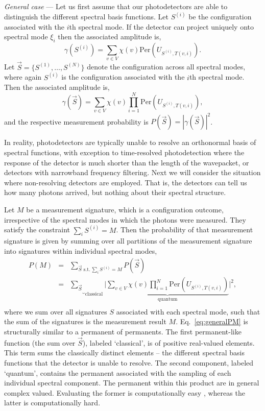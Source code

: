 \documentclass[aps,prl,twocolumn,amsmath,amssymb,nofootinbib,superscriptaddress]{revtex4}
\begin{document}
\emph{General case} --- Let us first assume that our photodetectors are able to distinguish the different spectral basis functions. Let $S^{(i)}$ be the configuration associated with the $i$th spectral mode. If the detector can project uniquely onto spectral mode $\xi_i$ then the associated amplitude is,
\begin{equation}
\gamma(S^{(i)}) = \sum_{v\in V} \chi(v) \mathrm{Per}\left(U_{S^{(i)},T(v,i)}\right).
\end{equation}
Let \mbox{$\vec{S}=\{S^{(1)},\dots,S^{(N)}\}$} denote the configuration across all spectral modes, where again $S^{(i)}$ is the configuration associated with the $i$th spectral mode. Then the associated amplitude is,
\begin{equation}
\gamma(\vec{S}) = \sum_{v\in V} \chi(v) \prod_{i=1}^N \mathrm{Per}\left(U_{S^{(i)},T(v,i)}\right),
\end{equation}
and the respective measurement probability is \mbox{$P(\vec{S})=|\gamma(\vec{S})|^2$}.

In reality, photodetectors are typically unable to resolve an orthonormal basis of spectral functions, with exception to time-resolved photodetection where the response of the detector is much shorter than the length of the wavepacket, or detectors with narrowband frequency filtering. Next we will consider the situation where non-resolving detectors are employed. That is, the detectors can tell us how many photons arrived, but nothing about their spectral structure.

Let $M$ be a measurement signature, which is a configuration outcome, irrespective of the spectral modes in which the photons were measured. They satisfy the constraint $\sum_i S^{(i)} = M$. Then the probability of that measurement signature is given by summing over all partitions of the measurement signature into signatures within individual spectral modes,
\begin{eqnarray} \label{eq:generalPM}
P(M) &=& \sum_{\vec{S}\,\,\mathrm{s.t.}\,\sum_i S^{(i)} = M} P(\vec{S}) \nonumber \\
&=& \underbrace{\sum_{\vec{S}}}_{\mathrm{classical}} \Bigg| \underbrace{\sum_{v\in V} \chi(v) \prod_{i=1}^N \mathrm{Per}\left(U_{S^{(i)},T(v,i)}\right)}_{\mathrm{quantum}}\Bigg|^2,\nonumber \\
\end{eqnarray}
where we sum over all signatures $S$ associated with each spectral mode, such that the sum of the signatures is the measurement result $M$. Eq.~\ref{eq:generalPM} is structurally similar to a permanent of permanents. The first permanent-like function (the sum over $\vec{S}$), labeled `classical', is of positive real-valued elements. This term sums the classically distinct elements -- the different spectral basis functions that the detector is unable to resolve. The second component, labeled `quantum', contains the permanent associated with the sampling of each individual spectral component. The permanent within this product are in general complex valued. Evaluating the former is computationally easy \cite{bib:SinclairPerm}, whereas the latter is computationally hard. 
\end{document}
